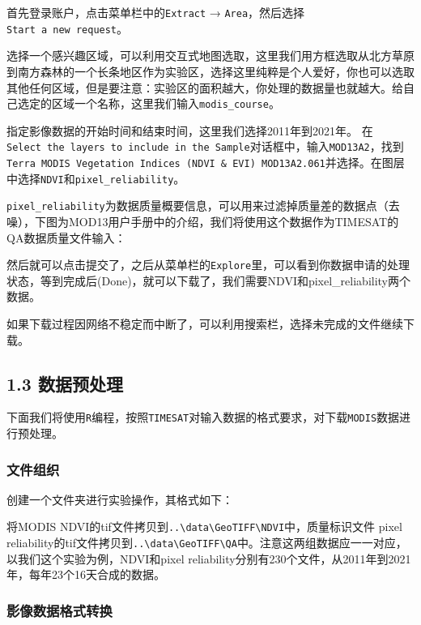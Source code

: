 \documentclass[
]{article}
\begin{document}
首先登录账户，点击菜单栏中的\texttt{Extract} →
\texttt{Area}，然后选择\texttt{Start\ a\ new\ request}。

选择一个感兴趣区域，可以利用交互式地图选取，这里我们用方框选取从北方草原到南方森林的一个长条地区作为实验区，选择这里纯粹是个人爱好，你也可以选取其他任何区域，但是要注意：实验区的面积越大，你处理的数据量也就越大。给自己选定的区域一个名称，这里我们输入\texttt{modis\_course}。

指定影像数据的开始时间和结束时间，这里我们选择2011年到2021年。
在\texttt{Select\ the\ layers\ to\ include\ in\ the\ Sample}对话框中，输入\texttt{MOD13A2}，找到\texttt{Terra\ MODIS\ Vegetation\ Indices\ (NDVI\ \&\ EVI)\ MOD13A2.061}并选择。在图层中选择\texttt{NDVI}和\texttt{pixel\_reliability}。

\texttt{pixel\_reliability}为数据质量概要信息，可以用来过滤掉质量差的数据点（去噪），下图为MOD13用户手册中的介绍，我们将使用这个数据作为TIMESAT的QA数据质量文件输入：

然后就可以点击提交了，之后从菜单栏的\texttt{Explore}里，可以看到你数据申请的处理状态，等到完成后(Done)，就可以下载了，我们需要NDVI和pixel\_reliability两个数据。

如果下载过程因网络不稳定而中断了，可以利用搜索栏，选择未完成的文件继续下载。

\hypertarget{ux6570ux636eux9884ux5904ux7406}{%
\subsection{1.3 数据预处理}\label{ux6570ux636eux9884ux5904ux7406}}

下面我们将使用\texttt{R}编程，按照\texttt{TIMESAT}对输入数据的格式要求，对下载\texttt{MODIS}数据进行预处理。

\hypertarget{ux6587ux4ef6ux7ec4ux7ec7}{%
\subsubsection{文件组织}\label{ux6587ux4ef6ux7ec4ux7ec7}}

创建一个文件夹进行实验操作，其格式如下：

将MODIS
NDVI的tif文件拷贝到\texttt{..\textbackslash{}data\textbackslash{}GeoTIFF\textbackslash{}NDVI}中，质量标识文件
pixel
reliability的tif文件拷贝到\texttt{..\textbackslash{}data\textbackslash{}GeoTIFF\textbackslash{}QA}中。注意这两组数据应一一对应，以我们这个实验为例，NDVI和pixel
reliability分别有230个文件，从2011年到2021年，每年23个16天合成的数据。

\hypertarget{ux5f71ux50cfux6570ux636eux683cux5f0fux8f6cux6362}{%
\subsubsection{影像数据格式转换}\label{ux5f71ux50cfux6570ux636eux683cux5f0fux8f6cux6362}}
\end{document}
